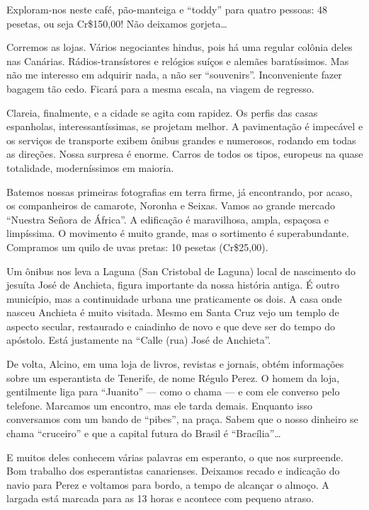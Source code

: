 Exploram-nos neste café, pão-manteiga e ``toddy'' para quatro pessoas: 48 pesetas, ou seja Cr\$150,00! Não deixamos gorjeta\ldots

Corremos as lojas. Vários negociantes hindus, pois há uma regular colônia deles nas Canárias. Rádios-transístores e relógios suíços e alemães baratíssimos. Mas não me interesso em adquirir nada, a não ser ``souvenirs''. Inconveniente fazer bagagem tão cedo. Ficará para a mesma escala, na viagem de regresso.

Clareia, finalmente, e a cidade se agita com rapidez. Os perfis das casas espanholas, interessantíssimas, se projetam melhor. A pavimentação é impecável e os serviços de transporte exibem ônibus grandes e numerosos, rodando em todas as direções. Nossa surpresa é enorme. Carros de todos os tipos, europeus na quase totalidade, moderníssimos em maioria.

Batemos nossas primeiras fotografias em terra firme, já encontrando, por acaso, os companheiros de camarote, Noronha e Seixas. Vamos ao grande mercado ``Nuestra Señora de África''. A edificação é maravilhosa, ampla, espaçosa e limpíssima. O movimento é muito grande, mas o sortimento é superabundante. Compramos um quilo de uvas pretas: 10 pesetas (Cr\$25,00).

Um ônibus nos leva a Laguna (San Cristobal de Laguna) local de nascimento do jesuíta José de Anchieta, figura importante da nossa história antiga. É outro município, mas a continuidade urbana une praticamente os dois. A casa onde nasceu Anchieta é muito visitada. Mesmo em Santa Cruz vejo um templo de aspecto secular, restaurado e caiadinho de novo e que deve ser do tempo do apóstolo. Está justamente na ``Calle (rua) José de Anchieta''.

De volta, Alcino, em uma loja de livros, revistas e jornais, obtém informações sobre um esperantista de Tenerife, de nome Régulo Perez. O homem da loja, gentilmente liga para ``Juanito'' --- como o chama --- e com ele converso pelo telefone. Marcamos um encontro, mas ele tarda demais. Enquanto isso conversamos com um bando de ``pibes'', na praça. Sabem que o nosso dinheiro se chama ``cruceiro'' e que a capital futura do Brasil é ``Bracília''\ldots

E muitos deles conhecem várias palavras em esperanto, o que nos surpreende. Bom trabalho dos esperantistas canarienses. Deixamos recado e indicação do navio para Perez e voltamos para bordo, a tempo de alcançar o almoço. A largada está marcada para as 13 horas e acontece com pequeno atraso.

